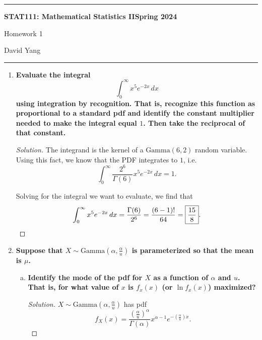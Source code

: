 \documentclass[11pt]{article}
\newenvironment{solution}
  {\renewcommand\qedsymbol{$\blacksquare$}\begin{proof}[Solution]}
  {\end{proof}}
\begin{document}
	\hrule
	\begin{center}
        \textbf{STAT111: Mathematical Statistics II}\hfill \textbf{Spring 2024}\newline

		{\Large Homework 1}

		David Yang
	\end{center}

\hrule

\vspace{1em}

\begin{enumerate}
    \item \textbf{Evaluate the integral}
    \[
        \int_0^{\infty} x^5 e^{-2x} \, dx
    \] 
    \textbf{using integration by recognition. That is, recognize this function as proportional to a standard pdf 
    and identify the constant multiplier needed to make the integral equal $1$. Then take the reciprocal of that constant.}

    \begin{solution}
    The integrand is the kernel of a $\mathrm{Gamma}(6, 2)$ random variable. \\

    Using this fact, we know that the PDF integrates to $1$, i.e.
    \[
        \int_0^{\infty} \frac{2^6}{\Gamma(6)}x^5 e^{-2x} \, dx = 1.
    \] 
    
    Solving for the integral we want to evaluate, we find that
    \[
        \int_0^{\infty} x^5 e^{-2x} \, dx = \frac{\Gamma(6)}{2^6} = \frac{(6-1)!}{64} = \boxed{\frac{15}{8}}. \qedhere
    \] 
    \end{solution}

\newpage

    \item \textbf{Suppose that $X \sim \mathrm{Gamma}\left(\alpha, \frac{\alpha}{u}\right)$ is parameterized so that the mean is $\mu$.}
    
    \begin{enumerate}[a)]
        \item \textbf{Identify the mode of the pdf for $X$ as a function of $\alpha$ and $u$. That is, for what value of $x$ is $f_x(x)$ (or $\ln f_x(x)$) maximized?} 
    
        \begin{solution}
        $X \sim \mathrm{Gamma}\left(\alpha, \frac{\alpha}{u}\right)$ has pdf 
        \[
            f_X(x) = \frac{\left( \frac{\alpha}{u} \right)^{\alpha} }{\Gamma(\alpha)} x^{\alpha - 1} e^{-\left( \frac{\alpha}{u} \right)x}.
        \]


\end{solution}
\end{enumerate}
\end{enumerate}
\end{document}
